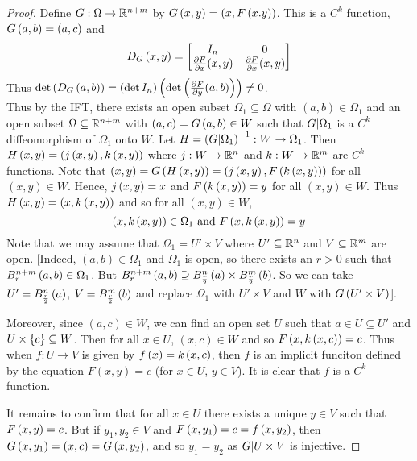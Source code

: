 \begin{proof}
    Define $G: \Omega \to \mathbb{R}^{n + m}$ by $G\left(x,y\right) = (x, F\left(x.y\right))$. This is a $C^k$ function, $G\left(a,b\right) = (a, c)$ and
    $$D_G\left(x,y\right) = \begin{bmatrix}
        I_n & 0 \\
        \frac{\partial F}{\partial x}(x,y) & \frac{\partial F}{\partial x}(x,y)
    \end{bmatrix}$$
    Thus $\det\left(D_G\left(a,b\right)\right) = \left(\det I_n\right)\left(\det\left(\frac{\partial F}{\partial y}(a,b)\right)\right) \neq 0$. \\
    Thus by the IFT, there exists an open subset $\Omega_1 \subseteq \Omega$ with $(a,b) \in \Omega_1$ and an open subset $\Omega \subseteq \mathbb{R}^{n + m}$ with $(a,c) = G\left(a,b\right) \in W$ such that $G \vert \Omega_1$ is a $C^k$ diffeomorphism of $\Omega_1$ onto $W$.
    Let $H = \left(G \vert \Omega_1\right)^{-1}: W \to \Omega_1$. Then $H\left(x,y\right) = \left(j\left(x,y\right), k\left(x,y\right)\right)$ where $j: W \to \mathbb{R}^n$ and $k: W \to \mathbb{R}^m$ are $C^k$ functions. Note that $(x,y) = G\left(H\left(x,y\right)\right) = \left(j\left(x,y\right), F\left(k\left(x,y\right)\right)\right)$ for all $(x,y) \in W$. Hence, $j\left(x,y\right) = x$ and $F\left(k\left(x,y\right)\right) = y$ for all $(x,y) \in W$. Thus $H\left(x,y\right) = \left(x, k\left(x,y\right)\right)$ and so for all $(x,y) \in W$,
    \[\left(x, k\left(x,y\right)\right) \in \Omega_1 \text{ and } F\left(x,k\left(x,y\right)\right) = y\]
    Note that we may assume that $\Omega_1 = U' \times V$ where $U' \subseteq \mathbb{R}^n$ and $V \subseteq \mathbb{R}^m$ are open. [Indeed, $(a,b) \in \Omega_1$ and $\Omega_1$ is open, so there exists an $r > 0$ such that $B^{n + m}_r\left(a,b\right) \in \Omega_1$. But $B^{n + m}_r\left(a,b\right) \supseteq B^{n}_{\frac{r}{2}}\left(a\right) \times B^{m}_{\frac{r}{2}}\left(b\right)$. So we can take $U' = B^{n}_\frac{r}{2}\left(a\right)$, $V = B^m_\frac{r}{2}\left(b\right)$ and replace $\Omega_1$ with $U' \times V$ and $W$ with $G\left(U' \times V\right)$].

    Moreover, since $(a,c) \in W$, we can find an open set $U$ such that $a \in U \subseteq U'$ and $U \times \left\{c\right\} \subseteq W$. Then for all $x \in U$, $(x,c) \in W$ and so $F\left(x, k\left(x,c\right)\right) = c$. Thus when $f: U \to V$ is given by $f\left(x\right) = k\left(x,c\right)$, then $f$ is an implicit funciton defined by the equation $F(x,y) = c$ (for $x \in U$, $y \in V$). It is clear that $f$ is a $C^k$ function.

    It remains to confirm that for all $x \in U$ there exists a unique $y \in V$ such that $F\left(x,y\right) = c$. But if $y_1, y_2 \in V$ and $F\left(x,y_1\right) = c = f\left(x,y_2\right)$, then $G\left(x,y_1\right) = (x,c) = G\left(x,y_2\right)$, and so $y_1 = y_2$ as $G \vert U \times V$ is injective.
\end{proof}